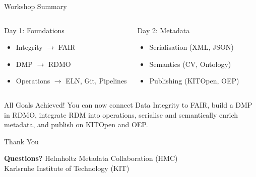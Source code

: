 \begin{frame}{Workshop Summary}
    \begin{columns}
        \begin{block}{Day 1: Foundations}
            \begin{itemize}
                \item Integrity $\rightarrow$ FAIR
                \item DMP $\rightarrow$ RDMO
                \item Operations $\rightarrow$ ELN, Git, Pipelines
            \end{itemize}
        \end{block}
        
        \begin{block}{Day 2: Metadata}
            \begin{itemize}
                \item Serialisation (XML, JSON)
                \item Semantics (CV, Ontology)
                \item Publishing (KITOpen, OEP)
            \end{itemize}
        \end{block}
    \end{columns}
    \vfill
    \begin{block}{All Goals Achieved!}
        You can now connect Data Integrity to FAIR, build a DMP in RDMO, integrate RDM into operations, serialise and semantically enrich metadata, and publish on KITOpen and OEP.
    \end{block}
\end{frame}

\begin{frame}{Thank You}
    \begin{center}
        \vfill
        \Huge{\textbf{Questions?}}
        \vfill
        \vfill
        \large{Helmholtz Metadata Collaboration (HMC)} \\
        \large{Karlsruhe Institute of Technology (KIT)}
    \end{center}
\end{frame}